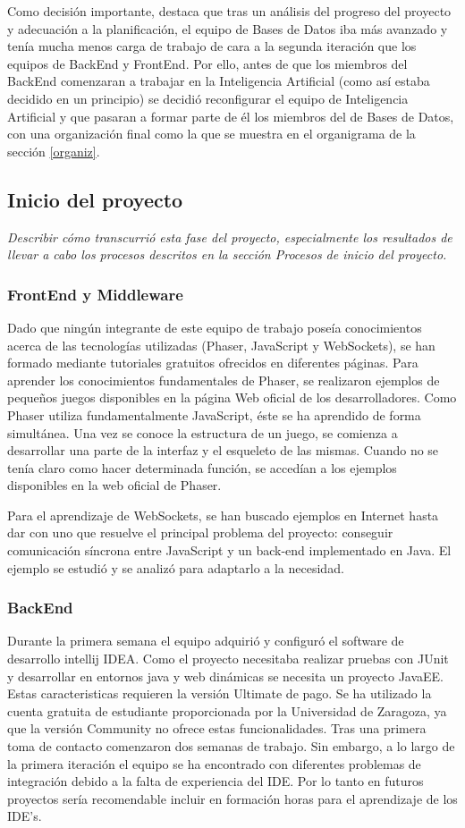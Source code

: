 Como decisión importante, destaca que tras un análisis del progreso del proyecto y adecuación a la planificación, el equipo de Bases de Datos iba más avanzado y tenía mucha menos carga de trabajo de cara a la segunda iteración que los equipos de BackEnd y FrontEnd. Por ello, antes de que los miembros del BackEnd comenzaran a trabajar en la Inteligencia Artificial (como así estaba decidido en un principio) se decidió reconfigurar el equipo de Inteligencia Artificial y que pasaran a formar parte de él los miembros del de Bases de Datos, con una organización final como la que se muestra en el organigrama de la sección \ref{organiz}.

\subsection{Inicio del proyecto}
\label{Inicio del proyecto}
\emph{Describir cómo transcurrió esta fase del proyecto, especialmente los resultados de llevar a cabo los procesos descritos en la sección Procesos de inicio del proyecto.}
\subsubsection*{FrontEnd y Middleware}
Dado que ningún integrante de este equipo de trabajo poseía conocimientos acerca de las tecnologías utilizadas (Phaser, JavaScript y WebSockets), se han formado mediante tutoriales gratuitos ofrecidos en diferentes páginas.
Para aprender los conocimientos fundamentales de Phaser, se realizaron ejemplos de pequeños juegos disponibles en la página Web oficial de los desarrolladores. Como Phaser utiliza fundamentalmente JavaScript, éste se ha aprendido de forma simultánea. Una vez se conoce la estructura de un juego, se comienza a desarrollar una parte de la interfaz y el esqueleto de las mismas. Cuando no se tenía claro como hacer determinada función, se accedían a los ejemplos disponibles en la web oficial de Phaser.

Para el aprendizaje de WebSockets, se han buscado ejemplos en Internet hasta dar con uno que resuelve el principal problema del proyecto: conseguir comunicación síncrona entre JavaScript y un back-end implementado en Java. El ejemplo se estudió y se analizó para adaptarlo a la necesidad.


\subsubsection*{BackEnd}
Durante la primera semana el equipo adquirió y configuró el software de desarrollo intellij IDEA. Como el proyecto necesitaba realizar pruebas con JUnit y desarrollar en entornos java y web dinámicas se necesita un proyecto JavaEE. Estas caracteristicas requieren la versión Ultimate de pago. Se ha utilizado la cuenta gratuita de estudiante proporcionada por la Universidad de Zaragoza, ya que la versión Community no ofrece estas funcionalidades.
Tras una primera toma de contacto comenzaron dos semanas de trabajo. Sin embargo, a lo largo de la primera iteración el equipo se ha encontrado con diferentes problemas de integración debido a la falta de experiencia del IDE. Por lo tanto en futuros proyectos sería recomendable incluir en formación horas para el aprendizaje de los IDE's.

